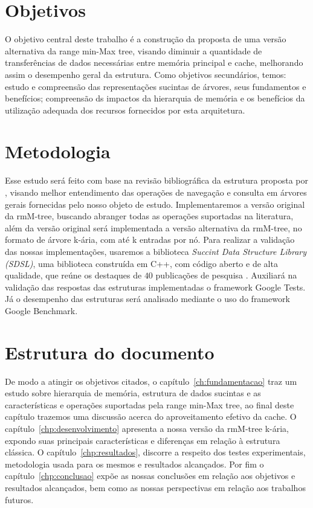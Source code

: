 \section{Objetivos}
O objetivo central deste trabalho é a construção da proposta de uma versão alternativa da range min-Max tree, visando diminuir a quantidade de transferências de dados necessárias entre memória principal e cache, melhorando assim o desempenho geral da estrutura.  Como objetivos secundários, temos: estudo e compreensão das representações sucintas de árvores, seus fundamentos e benefícios;  compreensão ds impactos da hierarquia de memória e os benefícios da utilização adequada dos recursos fornecidos por esta arquitetura. 

\section{Metodologia}
Esse estudo será feito com base na revisão bibliográfica da estrutura proposta por \citet{paper-fully-functinal-succint-trees}, visando melhor entendimento das operações de navegação e consulta em árvores gerais fornecidas pelo nosso objeto de estudo. Implementaremos a versão original da rmM-tree, buscando abranger todas as operações suportadas na literatura, além da versão original será implementada a versão alternativa da rmM-tree, no formato de árvore k-ária, com até k entradas por nó. Para realizar a validação das nossas implementações, usaremos a biblioteca \textit{Succint Data Structure Library (SDSL)}, uma biblioteca construída em C++, com código aberto e de alta qualidade, que reúne os destaques de $40$ publicações de pesquisa \citep{sdsl-article}. Auxiliará na validação das respostas das estruturas implementadas o framework Google Tests. Já o desempenho das estruturas será analisado mediante o uso do framework Google Benchmark.



\section{Estrutura do documento}
De modo a atingir os objetivos citados, o capítulo~\ref{ch:fundamentacao} traz um estudo sobre hierarquia de memória, estrutura de dados sucintas e as características e operações suportadas pela range min-Max tree, ao final deste capítulo trazemos uma discussão acerca do aproveitamento efetivo da cache. O capítulo~\ref{chp:desenvolvimento} apresenta a nossa versão da rmM-tree k-ária, expondo suas principais características e diferenças em relação à estrutura clássica. O capítulo~\ref{chp:resultados}, discorre a respeito dos testes experimentais, metodologia usada para os mesmos e resultados alcançados. Por fim o capítulo~\ref{chp:conclusao} expõe as nossas conclusões em relação 
aos objetivos e resultados alcançados, bem como as nossas perspectivas em relação aos trabalhos futuros.

